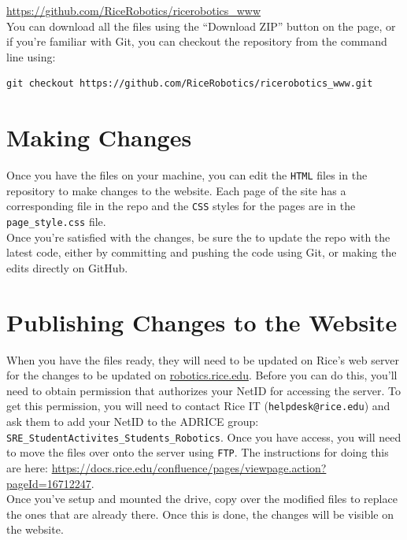 \documentclass{article}
\begin{document}
    \url{https://github.com/RiceRobotics/ricerobotics_www}\\

    You can download all the files using the ``Download ZIP'' button on the page,
    or if you're familiar with Git, you can checkout the repository from the command line
    using: \begin{verbatim}git checkout https://github.com/RiceRobotics/ricerobotics_www.git\end{verbatim}

    \section{Making Changes}
    \label{sec:Making Changes}
    Once you have the files on your machine, you can edit the \texttt{HTML}
    files in the repository to make changes to the website. Each page of the
    site has a corresponding file in the repo and the \texttt{CSS} styles for
    the pages are in the \texttt{page\_style.css} file.\\

    Once you're satisfied with the changes, be sure the to update the repo with
    the latest code, either by committing and pushing the code using Git, or
    making the edits directly on GitHub.

    \section{Publishing Changes to the Website}
    \label{sec:Publishing Changes to the Website}
    When you have the files ready, they will need to be updated on Rice's web
    server for the changes to be updated on \url{robotics.rice.edu}. Before you
    can do this, you'll need to obtain permission that authorizes your NetID
    for accessing the server.  To get this permission, you will need to contact
    Rice IT (\texttt{helpdesk@rice.edu}) and ask them to add your NetID to the
    ADRICE group: \texttt{SRE\_StudentActivites\_Students\_Robotics}.  Once you
    have access, you will need to move the files over onto the server using
    \texttt{FTP}.  The instructions for doing this are here:
    \url{https://docs.rice.edu/confluence/pages/viewpage.action?pageId=16712247}.\\

    Once you've setup and mounted the drive, copy over the modified files to
    replace the ones that are already there. Once this is done, the changes
    will be visible on the website.
\end{document}

